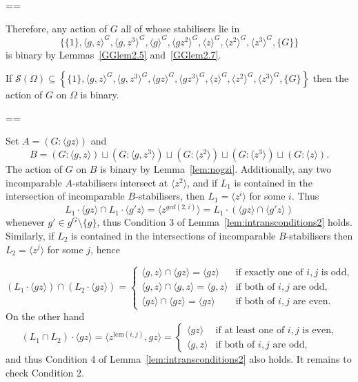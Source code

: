 \documentclass[11pt, a4paper]{amsart}
\makeatletter
\newcommand\lcm{\mathrm{lcm}}
\renewcommand{\proofname}{Proof}
\renewenvironment{proof}[1][\proofname]{\par
  \pushQED{\qed}  \normalfont \partopsep=\z@skip \topsep=\z@skip
  \trivlist
  \item[\hskip\labelsep
        \scshape
    #1\@addpunct{.}]\ignorespaces
}{  \popQED\endtrivlist\@endpefalse
}
\makeatother
\begin{document}
\begin{proof}
     Therefore, any action of $G$ all of whose stabilisers lie in $$\{\{1\},\langle g,z\rangle^G,\langle g,z^3\rangle^G,\langle g\rangle^G,\langle gz^2\rangle^G,\langle z\rangle^G,\langle z^2\rangle^G,\langle z^3\rangle^G,\{G\}\}$$ is binary by Lemmas~\ref{GGlem2.5} and~\ref{GGlem2.7}.
\end{proof}

\begin{lemma}\label{lem:gz}
    If $\mathcal{S}(\Omega)\subseteq\left\{\{1\},\langle g,z\rangle^G,\langle g,z^3\rangle^G,\langle gz\rangle^G,\langle gz^3\rangle^G,\langle z\rangle^G,\langle z^2\rangle^G,\langle z^3\rangle^G,\{G\}\right\}$ then the action of $G$ on $\Omega$ is binary.
\end{lemma}
\begin{proof}
    Set $A=(G:\langle gz\rangle)$ and $$B=(G:\langle g,z\rangle)\sqcup(G:\langle g,z^3\rangle)\sqcup(G:\langle z^2\rangle)\sqcup(G:\langle z^3\rangle)\sqcup(G:\langle z\rangle).$$ The action of $G$ on $B$ is binary by Lemma~\ref{lem:nogzi}. Additionally, any two incomparable $A$-stabilisers intersect at $\langle z^2\rangle$, and  if $L_1$ is contained in the intersection of incomparable $B$-stabilisers, then $L_1=\langle z^i\rangle$ for some $i$. Thus $$L_1\cdot \langle gz\rangle\cap L_1\cdot\langle g'z\rangle=\langle z^{gcd(2,i)}\rangle=L_1\cdot (\langle gz\rangle \cap\langle g'z\rangle)$$ whenever $g'\in g^G\setminus \{g\}$, thus Condition 3 of Lemma~\ref{lem:intransconditions2} holds. Similarly, if $L_2$ is contained in the intersections of incomparable $B$-stabilisers then $L_2=\langle z^j\rangle$ for some $j$, hence

    $$(L_1\cdot\langle gz\rangle)\cap (L_2\cdot\langle gz\rangle)=\begin{cases}
        \langle g,z\rangle\cap\langle gz\rangle=\langle gz\rangle&\text{if exactly one of $i,j$ is odd,}\\
        \langle g,z\rangle\cap\langle g,z\rangle=\langle g,z\rangle&\text{if both of $i,j$ are odd,}\\
        \langle gz\rangle\cap\langle gz\rangle=\langle gz\rangle&\text{if both of $i,j$ are even.}
    \end{cases}$$
     On the other hand
     $$(L_1\cap L_2)\cdot\langle gz\rangle=\langle z^{\lcm(i,j)},gz\rangle=\begin{cases}
        \langle gz\rangle&\text{if at least one of $i,j$ is even,}\\
        \langle g,z\rangle&\text{if both of $i,j$ are odd,}
    \end{cases}$$
    and thus Condition 4 of Lemma~\ref{lem:intransconditions2} also holds. It remains to check Condition 2.


\end{proof}
\end{document}
